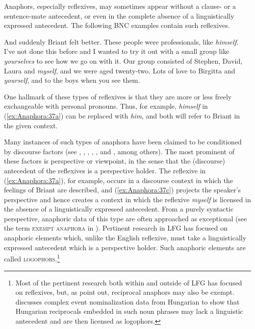 \documentclass[output=paper,hidelinks]{langscibook}
\begin{document}
Anaphors, especially reflexives, may sometimes appear without a clause- or a sentence-mate antecedent, or even in the complete absence of a linguistically expressed antecedent. The following BNC \citep{noauthor_undated-hr} examples contain such reflexives.

\ea\label{ex:Anaphora:37}
\ea\label{ex:Anaphora:37a} And suddenly Briant felt better. These people were    professionals, like \emph{himself}.
\ex\label{ex:Anaphora:37b} I've not done this before and I wanted to try it out with a   small group like \emph{yourselves} to see how we go on with it.
\ex\label{ex:Anaphora:37c} Our group consisted of Stephen, David, Laura and    \emph{myself}, and we were aged twenty-two.
\ex\label{ex:Anaphora:37d} Lots of love to Birgitta and \emph{yourself}, and to the boys    when you see them.
\z\z

\noindent One hallmark of these types of reflexives is that they are more or less freely exchangeable with personal pronouns. Thus, for example, \emph{himself} in (\ref{ex:Anaphora:37a}) can be replaced with \emph{him}, and both will refer to Briant in the given context.

Many instances of such types of anaphora have been claimed to be conditioned by discourse factors (see \citealt{Maling84}, \citealt{Sells:Log}, \citealt{Pollard1992-cv}, \citealt{10.2307/4178836}, \citealt{Culy:Log}, and \citealt{BresnanEtAl2016}, among others). The most prominent of these factors is perspective or viewpoint, in the sense that the (discourse) antecedent of the reflexives is a perspective holder. The reflexive in (\ref{ex:Anaphora:37a}), for example, occurs in a discourse context in which the feelings of Briant are described, and (\ref{ex:Anaphora:37c}) projects the speaker's perspective and hence creates a context in which the reflexive \emph{myself} is licensed in the absence of a linguistically expressed antecedent. From a purely syntactic perspective, anaphoric data of this type are often approached as exceptional (see the term \textsc{exempt anaphora} in \citealt{Pollard1992-cv}). Pertinent research in LFG has focused on anaphoric elements which, unlike the English reflexive, must take a linguistically expressed antecedent which is a perspective holder. Such anaphoric elements are called \textsc{logophors}.\footnote{Most of the pertinent research both within and outside of LFG has focused on reflexives, but, as \citet{Pollard1992-cv} point out, reciprocal anaphors may also be exempt. \citet{Szucs2019b} discusses complex event nominalization data from Hungarian to show that Hungarian reciprocals embedded in such noun phrases may lack a linguistic antecedent and are then licensed as logophors.}
\end{document}
